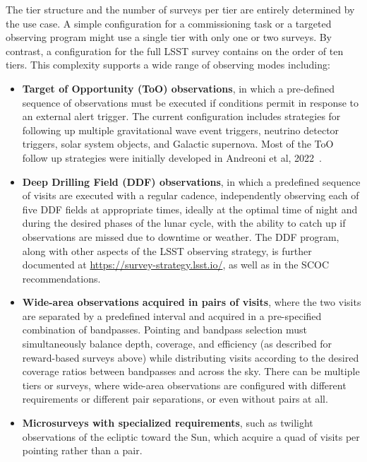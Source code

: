 The tier structure and the number of surveys per tier are entirely determined by
the use case. A simple configuration for a commissioning task or a targeted
observing program might use a single tier with only one or two surveys. By
contrast, a configuration for the full LSST survey contains on the order of ten
tiers. This complexity supports a wide range of observing modes including:
%
\begin{itemize}
  \item \textbf{Target of Opportunity (ToO) observations}, in which a
    pre-defined sequence of observations must be executed if conditions
    permit in response to an external alert trigger. 
    The current configuration includes strategies for following up multiple 
    gravitational wave event triggers, neutrino detector triggers, 
    solar system objects, and Galactic supernova.  Most of the ToO follow up 
    strategies were initially developed in Andreoni et al, 2022~\cite{Andreoni2022}.
  \item \textbf{Deep Drilling Field (DDF) observations}, in which a predefined
  sequence of visits are executed with a regular cadence, independently observing
   each of five DDF fields at appropriate times,
    ideally at the optimal time of night and during the desired phases of the
    lunar cycle, with the ability to catch up if observations are missed due to
    downtime or weather. 
    The DDF program, along with other aspects of the LSST observing strategy,
    is further documented at \url{https://survey-strategy.lsst.io/}\cite{jones_2026_20607766}, 
    as well as in the SCOC recommendations\cite{PSTN-053, PSTN-055, PSTN-056}. 
  \item \textbf{Wide-area observations acquired in pairs of visits}, where the
    two visits are separated by a predefined interval and acquired in a
    pre-specified combination of bandpasses. Pointing and bandpass selection
    must simultaneously balance depth, coverage, and efficiency (as described
    for reward-based surveys above) while distributing visits according to the
    desired coverage ratios between bandpasses and across the sky. 
    There can be multiple tiers or surveys, where wide-area observations
    are configured with different requirements or different pair separations, or
    even without pairs at all.  
  \item \textbf{Microsurveys with specialized requirements}, such as
    twilight observations of the ecliptic toward the Sun, which acquire a quad
    of visits per pointing rather than a pair. 
 \end{itemize}
%

